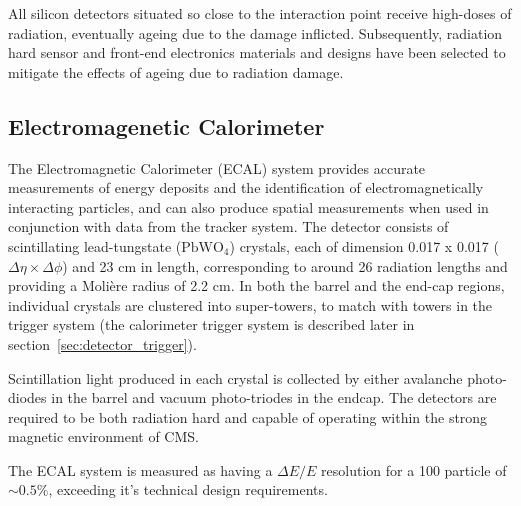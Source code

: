 All silicon detectors situated so close to the interaction point receive
high-doses of radiation, eventually ageing due to the damage inflicted. Subsequently, 
radiation hard sensor and front-end electronics materials and designs have been
selected to mitigate the effects of ageing due to radiation damage.

\subsection{Electromagenetic Calorimeter}



The Electromagnetic Calorimeter (ECAL) system provides accurate measurements of 
energy deposits and the identification of electromagnetically interacting 
particles, and can also produce spatial measurements when used in conjunction 
with data from the tracker system. The detector consists of scintillating
lead-tungstate
($\text{PbWO}_4$) crystals, each of dimension 0.017 x 0.017 ($\Delta \eta \times
\Delta \phi$) and 23 cm in length, corresponding to around 26 radiation lengths
and providing a Moli\`{e}re radius of 2.2 cm. In both the barrel and the
end-cap regions, individual crystals are clustered into super-towers, to match
with towers in the trigger system (the calorimeter trigger system is described
later in section~\ref{sec:detector_trigger}).

Scintillation light produced in each crystal is collected by either
avalanche photo-diodes in the barrel and vacuum photo-triodes in the
endcap. The detectors are required to be both radiation hard and capable of
operating within the strong magnetic environment of CMS.

The ECAL system is measured as having a $\Delta E/E$ resolution for a 100 \gev
particle of $\sim 0.5\%$, exceeding it's technical design requirements.

